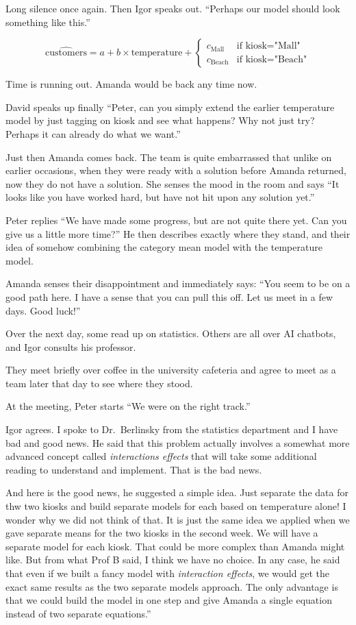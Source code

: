 \documentclass[
  12pt,
  letterpaper,
  DIV=11,
  numbers=noendperiod]{scrreprt}
\begin{document}
Long silence once again. Then Igor speaks out. ``Perhaps our model
should look something like this.''

\[
\widehat{\text{customers}}
= a + b\times \text{temperature}
+ \begin{cases}
c_{\text{Mall}} & \text{if } \text{kiosk}=\text{"Mall"} \\
c_{\text{Beach}} & \text{if } \text{kiosk}=\text{"Beach"}
\end{cases}
\]

Time is running out. Amanda would be back any time now.

David speaks up finally ``Peter, can you simply extend the earlier
temperature model by just tagging on kiosk and see what happens? Why not
just try? Perhaps it can already do what we want.''

Just then Amanda comes back. The team is quite embarrassed that unlike
on earlier occasions, when they were ready with a solution before Amanda
returned, now they do not have a solution. She senses the mood in the
room and says ``It looks like you have worked hard, but have not hit
upon any solution yet.''

Peter replies ``We have made some progress, but are not quite there yet.
Can you give us a little more time?'' He then describes exactly where
they stand, and their idea of somehow combining the category mean model
with the temperature model.

Amanda senses their disappointment and immediately says: ``You seem to
be on a good path here. I have a sense that you can pull this off. Let
us meet in a few days. Good luck!''

Over the next day, some read up on statistics. Others are all over AI
chatbots, and Igor consults his professor.

They meet briefly over coffee in the university cafeteria and agree to
meet as a team later that day to see where they stood.

At the meeting, Peter starts ``We were on the right track.''

Igor agrees. I spoke to Dr.~Berlinsky from the statistics department and
I have bad and good news. He said that this problem actually involves a
somewhat more advanced concept called \emph{interactions effects} that
will take some additional reading to understand and implement. That is
the bad news.

And here is the good news, he suggested a simple idea. Just separate the
data for thw two kiosks and build separate models for each based on
temperature alone! I wonder why we did not think of that. It is just the
same idea we applied when we gave separate means for the two kiosks in
the second week. We will have a separate model for each kiosk. That
could be more complex than Amanda might like. But from what Prof B said,
I think we have no choice. In any case, he said that even if we built a
fancy model with \emph{interaction effects}, we would get the exact same
results as the two separate models approach. The only advantage is that
we could build the model in one step and give Amanda a single equation
instead of two separate equations.''
\end{document}

